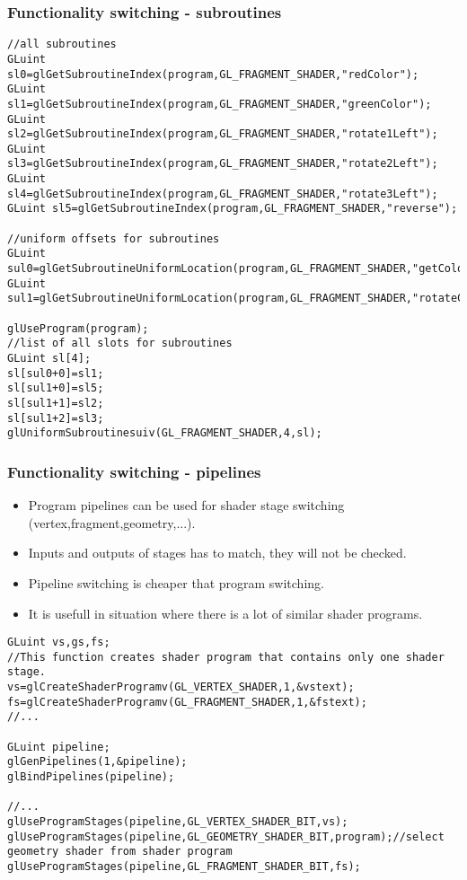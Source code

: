 \begin{frame}[fragile]
\frametitle{Functionality switching - subroutines}
    {\tiny
    \begin{verbatim}
//all subroutines
GLuint sl0=glGetSubroutineIndex(program,GL_FRAGMENT_SHADER,"redColor");
GLuint sl1=glGetSubroutineIndex(program,GL_FRAGMENT_SHADER,"greenColor");
GLuint sl2=glGetSubroutineIndex(program,GL_FRAGMENT_SHADER,"rotate1Left");
GLuint sl3=glGetSubroutineIndex(program,GL_FRAGMENT_SHADER,"rotate2Left");
GLuint sl4=glGetSubroutineIndex(program,GL_FRAGMENT_SHADER,"rotate3Left");
GLuint sl5=glGetSubroutineIndex(program,GL_FRAGMENT_SHADER,"reverse");

//uniform offsets for subroutines
GLuint sul0=glGetSubroutineUniformLocation(program,GL_FRAGMENT_SHADER,"getColor");
GLuint sul1=glGetSubroutineUniformLocation(program,GL_FRAGMENT_SHADER,"rotateColor");

glUseProgram(program);
//list of all slots for subroutines
GLuint sl[4];
sl[sul0+0]=sl1;
sl[sul1+0]=sl5;
sl[sul1+1]=sl2;
sl[sul1+2]=sl3;
glUniformSubroutinesuiv(GL_FRAGMENT_SHADER,4,sl);
    \end{verbatim}
    }
\end{frame}

\begin{frame}[fragile]
\frametitle{Functionality switching - pipelines}
\begin{itemize}
  \item Program pipelines can be used for shader stage switching (vertex,fragment,geometry,...).
  \item Inputs and outputs of stages has to match, they will not be checked.
  \item Pipeline switching is cheaper that program switching.
  \item It is usefull in situation where there is a lot of similar shader programs.
\end{itemize}
{\tiny
  \begin{verbatim}
GLuint vs,gs,fs;
//This function creates shader program that contains only one shader stage.
vs=glCreateShaderProgramv(GL_VERTEX_SHADER,1,&vstext);
fs=glCreateShaderProgramv(GL_FRAGMENT_SHADER,1,&fstext);
//...

GLuint pipeline;
glGenPipelines(1,&pipeline);
glBindPipelines(pipeline);

//...
glUseProgramStages(pipeline,GL_VERTEX_SHADER_BIT,vs);
glUseProgramStages(pipeline,GL_GEOMETRY_SHADER_BIT,program);//select geometry shader from shader program
glUseProgramStages(pipeline,GL_FRAGMENT_SHADER_BIT,fs);
  \end{verbatim}
}
\end{frame}

